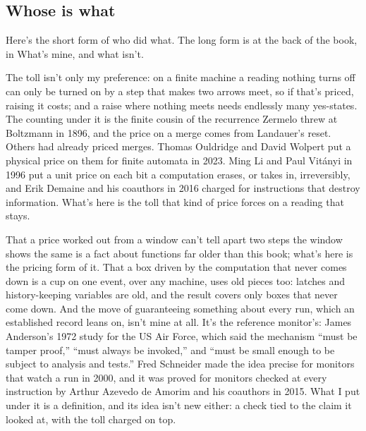 \documentclass[11pt,twoside]{article}
\theoremstyle{thielethm}
\theoremstyle{thieledef}
\theoremstyle{thieledef}
\theoremstyle{thieledef}
\theoremstyle{thielethm}
\theoremstyle{thieleobs}
\theoremstyle{thielethm}
\begin{document}
\subsection{Whose is what}

Here's the short form of who did what. The long form is at the back of the book, in What's mine, and what isn't.

The toll isn't only my preference: on a finite machine a reading nothing turns off can only be turned on by a step that makes two arrows meet, so if that's priced, raising it costs; and a raise where nothing meets needs endlessly many yes-states. The counting under it is the finite cousin of the recurrence Zermelo threw at Boltzmann in 1896, and the price on a merge comes from Landauer's reset. Others had already priced merges. Thomas Ouldridge and David Wolpert put a physical price on them for finite automata in 2023. Ming Li and Paul Vitányi in 1996 put a unit price on each bit a computation erases, or takes in, irreversibly, and Erik Demaine and his coauthors in 2016 charged for instructions that destroy information. What's here is the toll that kind of price forces on a reading that stays.

That a price worked out from a window can't tell apart two steps the window shows the same is a fact about functions far older than this book; what's here is the pricing form of it. That a box driven by the computation that never comes down is a cup on one event, over any machine, uses old pieces too: latches and history-keeping variables are old, and the result covers only boxes that never come down. And the move of guaranteeing something about every run, which an established record leans on, isn't mine at all. It's the reference monitor's: James Anderson's 1972 study for the US Air Force, which said the mechanism ``must be tamper proof,'' ``must always be invoked,'' and ``must be small enough to be subject to analysis and tests.'' Fred Schneider made the idea precise for monitors that watch a run in 2000, and it was proved for monitors checked at every instruction by Arthur Azevedo de Amorim and his coauthors in 2015. What I put under it is a definition, and its idea isn't new either: a check tied to the claim it looked at, with the toll charged on top.
\end{document}

